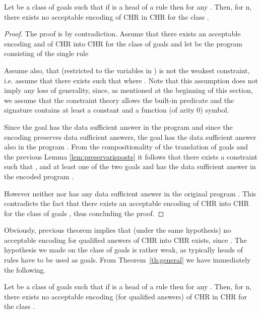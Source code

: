 \begin{theorem}\label{th:general}
Let  be a class of goals such that if    is a head of a rule then  for any . Then, for n, there exists no acceptable encoding of
CHR in CHR for the class .
\end{theorem}
\begin{proof}
The proof is by contradiction. Assume that there exists an acceptable encoding
 and 
 of CHR into CHR for the class of goals  and let  be the program consisting of the single rule
 
Assume also, that  (restricted to the variables in ) is not the weakest constraint, i.e. assume that there exists    such that  where . Note that this assumption does not imply any loss of generality, since, as mentioned at the beginning of this section, we assume that the constraint theory allows the built-in predicate  and the signature contains at least a constant and a function (of arity  0) symbol.

Since  the goal    has the data sufficient answer   in the program  and since the encoding preserves data sufficient answers,  the goal  has the data sufficient answer   also in the program .  From the compositionality of the translation of goals and the previous Lemma \ref{lem:preservarisposte} it follows that there exists a constraint  such that ,
 and
at least one of the two goals 
 and  has the data sufficient answer  in the encoded program .

However neither  
 nor  has any  data sufficient answer in the original program . This contradicts the fact that
 there exists an acceptable encoding
 of CHR into CHR for the class of goals , thus concluding the proof.
\end{proof}





Obviously, previous theorem implies that (under the same hypothesis) no acceptable encod\-ing for qualified answers of CHR into CHR exists,
since  . The hypothesis we made on the class of goals  is rather weak, as typically heads of rules have to be used as goals.
From  Theorem~\ref{th:general} we have immediately the
following.

\begin{corollary}\label{ch:general}
Let  be a class of goals such that if    is a head of a rule then  for any . Then, for n, there exists no acceptable encoding (for qualified answers) of
CHR in CHR for the class .
\end{corollary}



